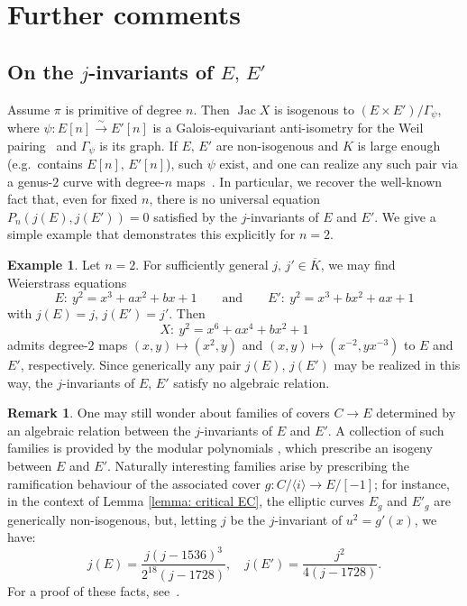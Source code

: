 \documentclass[a4paper,twoside,english]{amsart}
\theoremstyle{plain}
\theoremstyle{definition}
\newtheorem{remark}[theorem]{Remark}
\newtheorem{example}[theorem]{Example}
\begin{document}
\section{Further comments}

\subsection{On the \texorpdfstring{$j$}{j}-invariants of \texorpdfstring{$E,\, E'$}{E, E'}}
Assume $\pi$ is primitive of degree $n$. Then $\operatorname{Jac} X$ is isogenous to $(E\times E')/\Gamma_\psi$, where $\psi:E[n]\xrightarrow{\sim}E'[n]$ is a Galois-equivariant anti-isometry for the Weil pairing~\cite{freyCurvesGenus21991,MR1748483} and $\Gamma_\psi$ is its graph. If $E,\, E'$ are non-isogenous and $K$ is large enough (e.g.~contains $E[n],\, E'[n]$), such $\psi$ exist, and one can realize any such pair via a genus-$2$ curve with degree-$n$ maps~\cite[Proposition~1.5]{freyCurvesGenus21991}. In particular, we recover the well-known fact that, even for fixed $n$, there is no universal equation $P_n(j(E),j(E'))=0$ satisfied by the $j$-invariants of $E$ and $E'$. We give a simple example that demonstrates this explicitly for $n=2$. %

\begin{example}
Let $n=2$. For sufficiently general $j,\, j' \in \overline{K}$, we may find Weierstrass equations
\[
E:\ y^2=x^3+ax^2+bx+1 \qquad \text{and} \qquad E':\ y^2=x^3+bx^2+ax+1
\]
with $j(E)=j, \, j(E')=j'$. Then
\[
X:\ y^2=x^6+ax^4+bx^2+1
\]
admits degree-$2$ maps
$(x,y)\mapsto(x^2,y)$ and $(x,y)\mapsto(x^{-2},yx^{-3})$ to $E$ and $E'$, respectively. Since generically any pair $j(E),\, j(E')$ may be realized in this way, the $j$-invariants of $E,\, E'$ satisfy no algebraic relation.
\end{example}

\begin{remark}
    One may still wonder about families of covers $C \to E$ determined by an algebraic relation between the $j$-invariants of $E$ and $E'$. A collection of such families is provided by the modular polynomials \cite{MR2555986, MR4932442}, which prescribe an isogeny between $E$ and $E'$. Naturally interesting families arise by prescribing the ramification behaviour of the associated cover $g : C/\langle i \rangle \to E/[-1]$; for instance,
    in the context of Lemma \ref{lemma: critical EC},
    the elliptic curves $E_g$ and $E'_g$ are generically non-isogenous, but, letting $j$ be the $j$-invariant of $u^2=g'(x)$, we have:
    $$j(E)=\frac{j(j-1536)^3}{2^{18}(j-1728)}, \quad j(E')=\frac{j^2}{4(j-1728)}.$$
    For a proof of these facts, see~\cite[\S 5]{nac2}.
\end{remark}
\end{document}
